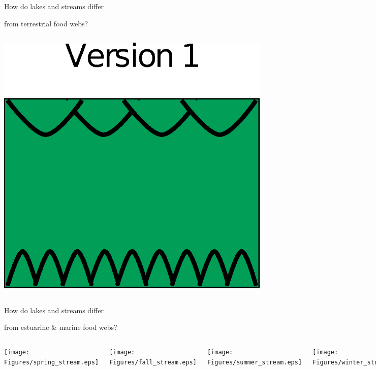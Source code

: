 \documentclass{beamer}
\begin{document}
\begin{frame}{How do lakes and streams differ}
\begin{block}{from terrestrial food webs?}
\begin{columns}
          \begin{center}
          \includegraphics[width=.5\columnwidth]{Figures/version1.eps}
          
          \end{center}  

        \column{.5in}

      \end{columns}
    \end{block}
  \end{frame}

  \begin{frame}{How do lakes and streams differ}
    \begin{block}{from estuarine \& marine food webs?}

      \begin{columns}
        \column{.5in}
        \column{1.9in}

        \hfill \texttt{[image: Figures/spring\_stream.eps]}

        \vspace{.2in}

        \hfill \texttt{[image: Figures/fall\_stream.eps]}

        \column{.2in}

        \column{1.9in}

        \texttt{[image: Figures/summer\_stream.eps]}

        \vspace{.2in}

        \texttt{[image: Figures/winter\_stream.eps]}

        \column{.5in}

      \end{columns}
    \end{block}

    \vfill

  \end{frame}
\end{document}
